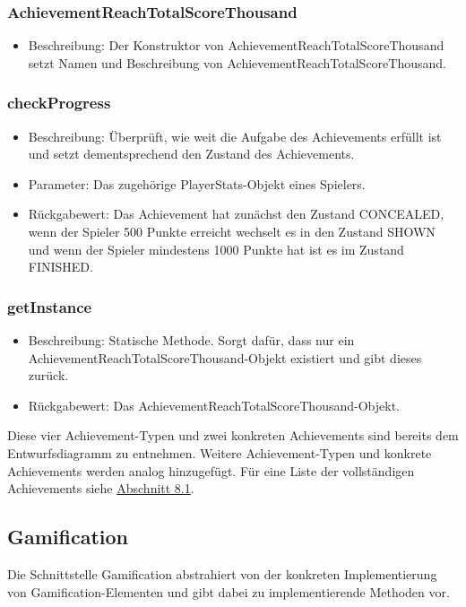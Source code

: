 \documentclass[a4paper]{scrreprt}
\begin{document}
	\subsubsection{AchievementReachTotalScoreThousand}
	\begin{itemize}
		\item Beschreibung: Der Konstruktor von AchievementReachTotalScoreThousand setzt Namen und Beschreibung von AchievementReachTotalScoreThousand.
	\end{itemize}
	\subsubsection{checkProgress}
	\begin{itemize}
		\item Beschreibung: Überprüft, wie weit die Aufgabe des Achievements erfüllt ist und setzt dementsprechend den Zustand des Achievements.
		\item Parameter: Das zugehörige PlayerStats-Objekt eines Spielers.
		\item Rückgabewert: Das Achievement hat zunächst den Zustand CONCEALED, wenn der Spieler 500 Punkte erreicht wechselt es in den Zustand SHOWN und wenn der Spieler mindestens 1000 Punkte hat ist es im Zustand FINISHED.
	\end{itemize}
	\subsubsection{getInstance}
	\begin{itemize}
		\item Beschreibung: Statische Methode. Sorgt dafür, dass nur ein AchievementReachTotalScoreThousand-Objekt existiert und gibt dieses zurück.
		\item Rückgabewert: Das AchievementReachTotalScoreThousand-Objekt.
	\end{itemize}

	\vspace{8pt}
	Diese vier Achievement-Typen und zwei konkreten Achievements sind bereits dem Entwurfsdiagramm zu entnehmen. Weitere Achievement-Typen und konkrete Achievements werden analog hinzugefügt. Für eine Liste der vollständigen Achievements siehe \hyperlink{Ach}{Abschnitt 8.1}. \\
	\vspace{8pt}


	\subsection{Gamification}
	Die Schnittstelle Gamification abstrahiert von der konkreten Implementierung von Gamification-Elementen und gibt dabei zu implementierende Methoden vor. \\
\end{document}
